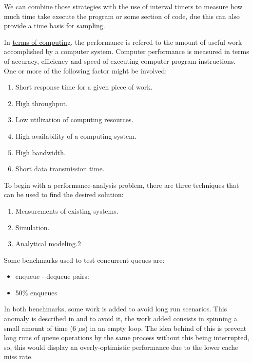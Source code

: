 \documentclass{latex/classes/thesis}
\begin{document}
We can combine those strategies with the use of interval timers to measure
how much time take execute the program or some section of code, due this can
also provide a time basis for sampling.

In \href{https://en.wikipedia.org/wiki/Computer\_performance}{terms of computing}, the performance is refered to the amount of useful
work accomplished by a computer system. Computer performance is measured in
terms of accuracy, efficiency and speed of executing computer program
instructions. One or more of the following factor might be involved:

\begin{enumerate}
\item Short response time for a given piece of work.
\item High throughput.
\item Low utilization of computing resources.
\item High availability of a computing system.
\item High bandwidth.
\item Short data transmission time.
\end{enumerate}

To begin with a performance-analysis problem, there are three techniques
that can be used to find the desired solution:

\begin{enumerate}
\item Measurements of existing systems.
\item Simulation.
\item Analytical modeling.2
\end{enumerate}

Some benchmarks used to test concurrent queues are:

\begin{itemize}
\item enqueue - dequeue pairs:
\item 50\% enqueues
\end{itemize}

In both benchmarks, some work is added to avoid long run scenarios. This
anomaly is described in \cite{DBLP_conf_podc_MichaelS96} and to avoid it, the
work added consists in spinning a small amount of time (6 \(\mu\)s) in an
empty loop. The idea behind of this is prevent long runs of queue operations
by the same process without this being interrupted, so, this would display
an overly-optimistic performance due to the lower cache miss rate.
\end{document}
